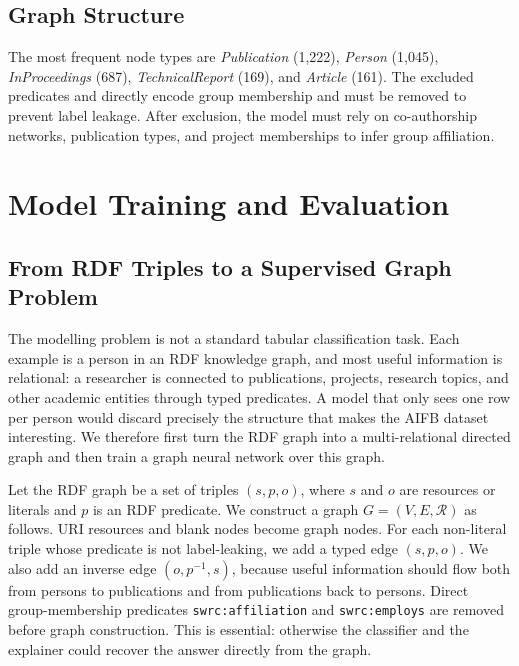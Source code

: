 \documentclass[runningheads]{llncs}
\begin{document}
\subsection{Graph Structure}

The most frequent node types are \emph{Publication} (1,222), \emph{Person} (1,045),
\emph{InProceedings} (687), \emph{TechnicalReport} (169), and \emph{Article} (161).
The excluded predicates  and 
directly encode group membership and must be removed to prevent label leakage.
After exclusion, the model must rely on co-authorship networks, publication types,
and project memberships to infer group affiliation.

\section{Model Training and Evaluation}

\subsection{From RDF Triples to a Supervised Graph Problem}

The modelling problem is not a standard tabular classification task.  Each example is a person in an
RDF knowledge graph, and most useful information is relational: a researcher is connected to publications,
projects, research topics, and other academic entities through typed predicates.  A model that only sees
one row per person would discard precisely the structure that makes the AIFB dataset interesting.
We therefore first turn the RDF graph into a multi-relational directed graph and then train a graph neural
network over this graph.

Let the RDF graph be a set of triples $(s,p,o)$, where $s$ and $o$ are resources or literals and $p$ is an
RDF predicate.  We construct a graph $G=(V,E,\mathcal{R})$ as follows.  URI resources and blank nodes become
graph nodes.  For each non-literal triple whose predicate is not label-leaking, we add a typed edge
$(s,p,o)$.  We also add an inverse edge $(o,p^{-1},s)$, because useful information should flow both from
persons to publications and from publications back to persons.  Direct group-membership predicates
\texttt{swrc:affiliation} and \texttt{swrc:employs} are removed before graph construction.  This is essential:
otherwise the classifier and the explainer could recover the answer directly from the graph.
\end{document}
